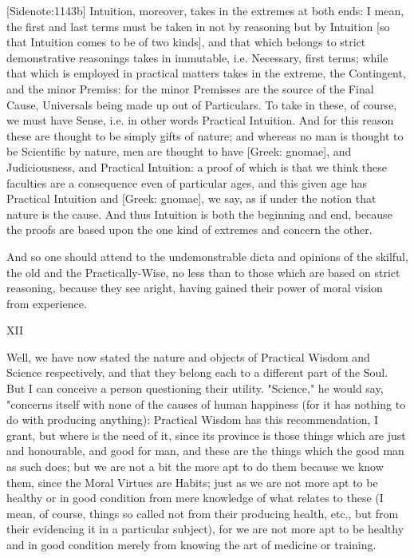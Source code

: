 [Sidenote:1143b] Intuition, moreover, takes in the extremes at both
ends: I mean, the first and last terms must be taken in not by reasoning
but by Intuition [so that Intuition comes to be of two kinds], and that
which belongs to strict demonstrative reasonings takes in immutable,
i.e. Necessary, first terms; while that which is employed in practical
matters takes in the extreme, the Contingent, and the minor Premiss: for
the minor Premisses are the source of the Final Cause, Universals being
made up out of Particulars. To take in these, of course, we must have
Sense, i.e. in other words Practical Intuition. And for this reason
these are thought to be simply gifts of nature; and whereas no man is
thought to be Scientific by nature, men are thought to have [Greek:
gnomae], and Judiciousness, and Practical Intuition: a proof of which is
that we think these faculties are a consequence even of particular ages,
and this given age has Practical Intuition and [Greek: gnomae], we say,
as if under the notion that nature is the cause. And thus Intuition is
both the beginning and end, because the proofs are based upon the one
kind of extremes and concern the other.

And so one should attend to the undemonstrable dicta and opinions of the
skilful, the old and the Practically-Wise, no less than to those which
are based on strict reasoning, because they see aright, having gained
their power of moral vision from experience.

XII

Well, we have now stated the nature and objects of Practical Wisdom and
Science respectively, and that they belong each to a different part
of the Soul. But I can conceive a person questioning their utility.
"Science," he would say, "concerns itself with none of the causes of
human happiness (for it has nothing to do with producing anything):
Practical Wisdom has this recommendation, I grant, but where is the need
of it, since its province is those things which are just and honourable,
and good for man, and these are the things which the good man as such
does; but we are not a bit the more apt to do them because we know them,
since the Moral Virtues are Habits; just as we are not more apt to be
healthy or in good condition from mere knowledge of what relates to
these (I mean, of course, things so called not from their producing
health, etc., but from their evidencing it in a particular subject),
for we are not more apt to be healthy and in good condition merely from
knowing the art of medicine or training.

